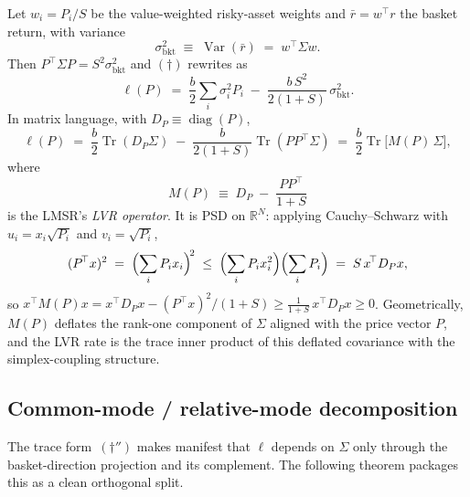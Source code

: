 \documentclass[11pt]{article}
\DeclareMathOperator{\Tr}{Tr}
\DeclareMathOperator{\diag}{diag}
\DeclareMathOperator{\Var}{Var}
\newcommand{\R}{\mathbb{R}}
\newcommand{\bkt}{\mathrm{bkt}}
\newcommand{\transp}{^{\!\top}}
\begin{document}
Let $w_i = P_i/S$ be the value-weighted risky-asset weights and $\bar r = w\transp r$ the basket return, with variance
\[
\sigma_{\bkt}^2 \;\equiv\; \Var(\bar r) \;=\; w\transp\Sigma w.
\]
Then $P\transp\Sigma P = S^2\sigma_{\bkt}^2$ and $(\dagger)$ rewrites as
\begin{equation*}
\ell(P) \;=\; \frac{b}{2}\sum_i \sigma_i^2 P_i \;-\; \frac{b\, S^2}{2(1+S)}\,\sigma_{\bkt}^2. \tag{$\dagger'$}
\end{equation*}
In matrix language, with $D_P \equiv \diag(P)$,
\begin{equation*}
\ell(P) \;=\; \frac{b}{2}\Tr(D_P \Sigma) \;-\; \frac{b}{2(1+S)}\Tr(PP\transp\Sigma) \;=\; \frac{b}{2}\Tr\!\bigl[M(P)\,\Sigma\bigr], \tag{$\dagger''$}
\end{equation*}
where
\[
M(P) \;\equiv\; D_P \;-\; \frac{PP\transp}{1+S}
\]
is the LMSR's \emph{LVR operator}. It is PSD on $\R^N$: applying Cauchy--Schwarz with $u_i = x_i\sqrt{P_i}$ and $v_i = \sqrt{P_i}$,
\[
(P\transp x)^2 \;=\; \Bigl(\sum_i P_i x_i\Bigr)^{\!2} \;\le\; \Bigl(\sum_i P_i x_i^2\Bigr)\Bigl(\sum_i P_i\Bigr) \;=\; S\, x\transp D_P x,
\]
so $x\transp M(P)x = x\transp D_P x - (P\transp x)^2/(1+S) \ge \tfrac{1}{1+S}\,x\transp D_P x \ge 0$. Geometrically, $M(P)$ deflates the rank-one component of $\Sigma$ aligned with the price vector $P$, and the LVR rate is the trace inner product of this deflated covariance with the simplex-coupling structure.

\subsection{Common-mode / relative-mode decomposition}

The trace form~$(\dagger'')$ makes manifest that $\ell$ depends on $\Sigma$ only through the basket-direction projection and its complement. The following theorem packages this as a clean orthogonal split.
\end{document}
